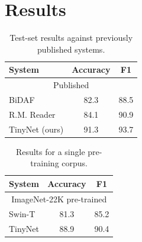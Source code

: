 \documentclass{article}
\begin{document}
\section{Results}

\begin{table}
\begin{tabular}{lcc}
System & Accuracy & F1 \\
\hline
\multicolumn{3}{c}{Published} \\
BiDAF~\cite{seo2017bidirectional} & 82.3 & 88.5 \\
R.M. Reader & 84.1 & 90.9 \\
\hline
TinyNet (ours) & 91.3 & 93.7 \\
\end{tabular}
\caption{Test-set results against previously published systems.}
\end{table}

\begin{table}
\begin{tabular}{lcc}
System & Accuracy & F1 \\
\hline
\multicolumn{3}{c}{ImageNet-22K pre-trained} \\
Swin-T~\citep{liu2021swin} & 81.3 & 85.2 \\
TinyNet & 88.9 & 90.4 \\
\end{tabular}
\caption{Results for a single pre-training corpus.}
\end{table}
\end{document}
